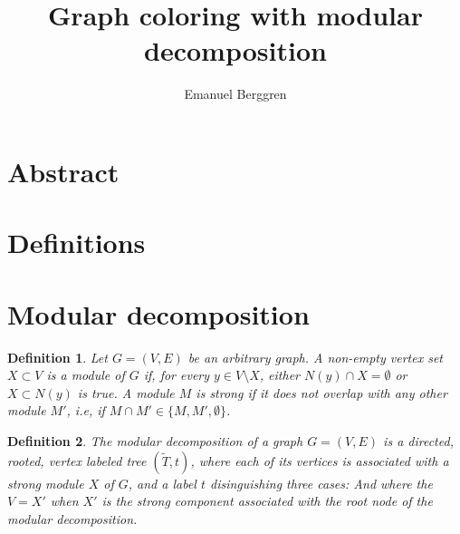 \documentclass{amsart}
\author{Emanuel Berggren}
\title{Graph coloring with modular decomposition}
\newtheorem{definition}{Definition}
\begin{document}
\maketitle

\section{Abstract}

\section{Definitions}



\section{Modular decomposition}

\begin{definition}
    Let $G = (V,E)$ be an arbitrary graph. A non-empty vertex set $X \subset V$
    is a \textit{module} of $G$ if, for every $y \in V \setminus X$,  either
    $N(y) \cap X = \emptyset$ or $X \subset N(y)$ is true. A module $M$ is
    \textit{strong} if it does not overlap with any other module $M'$, i.e, if 
    $M \cap M' \in \{M,M',\emptyset \}$.
\end{definition}
   

\begin{definition}
    The modular decomposition of a graph $G = (V,E)$ is a directed, rooted, vertex labeled tree
    $(\widetilde{T},t)$, where each of its vertices is associated with a strong
    module $X$ of $G$, and a label $t$ disinguishing  three cases:
    And where the $V = X'$ when $X'$ is the strong component associated with the
    root node of the modular decomposition.
\end{definition}
\end{document}
